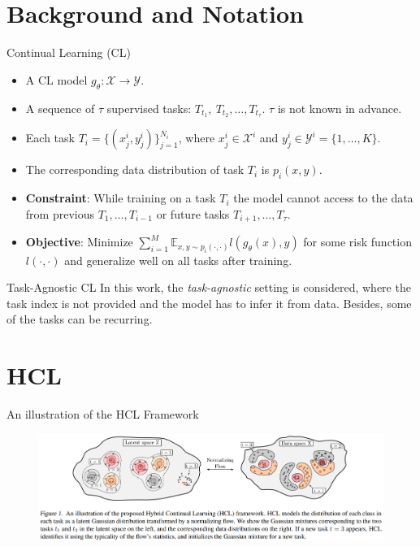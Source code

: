 \documentclass{beamer}
\begin{document}
\section{Background and Notation}
\begin{frame}{Continual Learning (CL)}
  \begin{itemize}
    \item <1-> A CL model $g_\theta : \mathcal{X} \rightarrow \mathcal{Y}$.
    \item <1-> A sequence of $\tau$ supervised tasks: $T_{t_1}, \ T_{t_2}, \dots, T_{t_\tau}$. $\tau$ is not known in advance.
    \item <1-> Each task $T_i = \{ (x_j^i, y_j^i) \}_{j = 1}^{N_i}$, where $x_j^i \in \mathcal{X}^i$ and $y_j^i \in \mathcal{Y}^i = \{ 1, \dots, K \}$.
    \item <1-> The corresponding data distribution of task $T_i$ is $p_i(x, y)$.
    \item <1-> \textbf{Constraint}: While training on a task $T_i$ the model cannot access to the data from previous $T_1, \dots, T_{i-1}$ or future tasks $T_{i+1}, \dots, T_{\tau}$.
    \item <1-> \textbf{Objective}: Minimize $\sum_{i = 1}^M \mathbb{E}_{x, y \sim p_i(\cdot, \cdot)}l(g_\theta(x), y)$ for some risk function $l(\cdot, \cdot)$ and generalize well on all tasks after training.
  \end{itemize} 
\end{frame}

\begin{frame}{Task-Agnostic CL}
  In this work, the \emph{task-agnostic} setting is considered, where the task index is not provided and the model has to infer it from data.
  Besides, some of the tasks can be recurring.
\end{frame}

\section{HCL}
\begin{frame}{An illustration of the HCL Framework}
  \begin{figure}
    \includegraphics[width=1\textwidth]{./figures/Model_illustration}
  \end{figure}
\end{frame}
\end{document}
